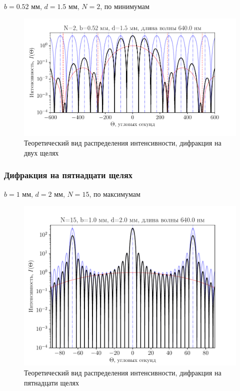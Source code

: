 \begin{table}[H]
	    \caption{$b=0.52$ мм, $d=1.5$ мм, $N=2$, по минимумам}
	    \label{tab:chem1} 

	\mytable
	
\end{table}
\begin{figure}[H]
	\centering
	\includegraphics[]{plot/N2}
	\caption{Теоретический вид распределения интенсивности, дифракция на двух щелях}
	\label{fig:figure1}
\end{figure}
\subsubsection{Дифракция на пятнадцати щелях}
\begin{table}[H]
	    \caption{$b=1$ мм, $d=2$ мм, $N=15$, по максимумам}
	    \label{tab:chem1}

	\mytable
	
\end{table}
\begin{figure}[H]
	\centering
	\includegraphics[]{plot/N15}
	\caption{Теоретический вид распределения интенсивности, дифракция на пятнадцати щелях}
	\label{fig:figure1}
\end{figure}



